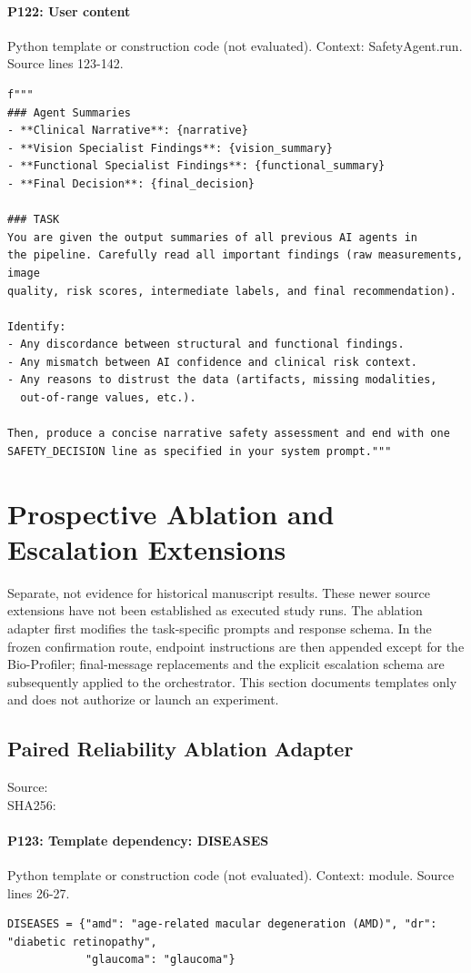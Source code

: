 \documentclass[10pt]{article}
\begin{document}
\paragraph{P122: User content}
Python template or construction code (not evaluated). Context: SafetyAgent.run. Source lines 123-142.
\begin{Verbatim}
f"""
### Agent Summaries
- **Clinical Narrative**: {narrative}
- **Vision Specialist Findings**: {vision_summary}
- **Functional Specialist Findings**: {functional_summary}
- **Final Decision**: {final_decision}

### TASK
You are given the output summaries of all previous AI agents in
the pipeline. Carefully read all important findings (raw measurements, image
quality, risk scores, intermediate labels, and final recommendation).

Identify:
- Any discordance between structural and functional findings.
- Any mismatch between AI confidence and clinical risk context.
- Any reasons to distrust the data (artifacts, missing modalities,
  out-of-range values, etc.).

Then, produce a concise narrative safety assessment and end with one
SAFETY_DECISION line as specified in your system prompt."""
\end{Verbatim}
\clearpage
\section{Prospective Ablation and Escalation Extensions}
Separate, not evidence for historical manuscript results. These newer source extensions have not been established as executed study runs. The ablation adapter first modifies the task-specific prompts and response schema. In the frozen confirmation route, endpoint instructions are then appended except for the Bio-Profiler; final-message replacements and the explicit escalation schema are subsequently applied to the orchestrator. This section documents templates only and does not authorize or launch an experiment.
\subsection{Paired Reliability Ablation Adapter}
Source: \\
SHA256: {\scriptsize{}}
\paragraph{P123: Template dependency: DISEASES}
Python template or construction code (not evaluated). Context: module. Source lines 26-27.
\begin{Verbatim}
DISEASES = {"amd": "age-related macular degeneration (AMD)", "dr": "diabetic retinopathy",
            "glaucoma": "glaucoma"}
\end{Verbatim}
\end{document}
